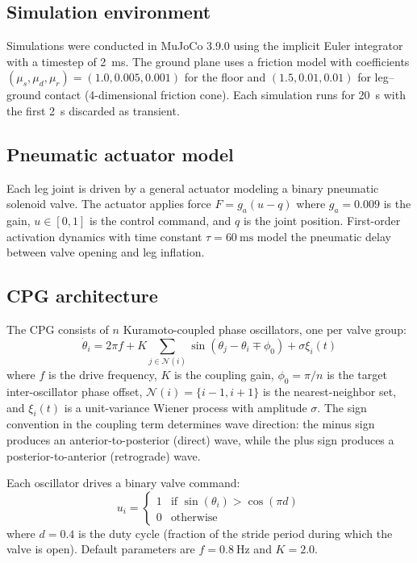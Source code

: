 \documentclass[12pt]{article}
\begin{document}
\subsection{Simulation environment}
\label{sec:simulation}

Simulations were conducted in MuJoCo 3.9.0 \citep{todorov2012mujoco}
using the implicit Euler integrator with a timestep of \SI{2}{\milli\second}.
The ground plane uses a friction model with coefficients
$(\mu_s, \mu_d, \mu_r) = (1.0, 0.005, 0.001)$ for the floor and
$(1.5, 0.01, 0.01)$ for leg--ground contact (4-dimensional friction cone).
Each simulation runs for \SI{20}{\second} with the first
\SI{2}{\second} discarded as transient.

\subsection{Pneumatic actuator model}
\label{sec:actuator}

Each leg joint is driven by a general actuator modeling a binary
pneumatic solenoid valve.
The actuator applies force $F = g_a (u - q)$ where $g_a = 0.009$ is
the gain, $u \in [0, 1]$ is the control command, and $q$ is the joint
position.
First-order activation dynamics with time constant
$\tau = \SI{60}{\milli\second}$ model the pneumatic delay between valve
opening and leg inflation.

\subsection{CPG architecture}
\label{sec:cpg}

The CPG consists of $n$ Kuramoto-coupled phase oscillators, one per
valve group:
\begin{equation}
\dot{\theta}_i = 2\pi f + K \sum_{j \in \mathcal{N}(i)}
    \sin(\theta_j - \theta_i \mp \phi_0) + \sigma \xi_i(t)
\label{eq:kuramoto}
\end{equation}
where $f$ is the drive frequency, $K$ is the coupling gain,
$\phi_0 = \pi / n$ is the target inter-oscillator phase offset,
$\mathcal{N}(i) = \{i-1, i+1\}$ is the nearest-neighbor set, and
$\xi_i(t)$ is a unit-variance Wiener process with amplitude $\sigma$.
The sign convention in the coupling term determines wave direction:
the minus sign produces an anterior-to-posterior (direct) wave, while
the plus sign produces a posterior-to-anterior (retrograde) wave.

Each oscillator drives a binary valve command:
\begin{equation}
u_i = \begin{cases}
    1 & \text{if } \sin(\theta_i) > \cos(\pi d) \\
    0 & \text{otherwise}
\end{cases}
\label{eq:valve}
\end{equation}
where $d = 0.4$ is the duty cycle (fraction of the stride period
during which the valve is open).
Default parameters are $f = \SI{0.8}{\hertz}$ and $K = 2.0$.
\end{document}

